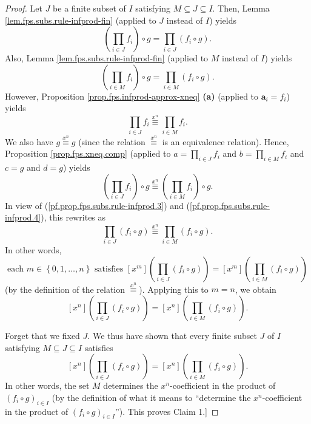\begin{fineprint}
\begin{proof}
Let $J$ be a finite subset of $I$ satisfying $M\subseteq J\subseteq I$. Then,
Lemma \ref{lem.fps.subs.rule-infprod-fin} (applied to $J$ instead of $I$)
yields%
\begin{equation}
\left(  \prod_{i\in J}f_{i}\right)  \circ g=\prod_{i\in J}\left(  f_{i}\circ
g\right)  . \label{pf.prop.fps.subs.rule-infprod.3}%
\end{equation}
Also, Lemma \ref{lem.fps.subs.rule-infprod-fin} (applied to $M$ instead of
$I$) yields%
\begin{equation}
\left(  \prod_{i\in M}f_{i}\right)  \circ g=\prod_{i\in M}\left(  f_{i}\circ
g\right)  . \label{pf.prop.fps.subs.rule-infprod.4}%
\end{equation}
However, Proposition \ref{prop.fps.infprod-approx-xneq} \textbf{(a)} (applied
to $\mathbf{a}_{i}=f_{i}$) yields%
\[
\prod_{i\in J}f_{i}\overset{x^{n}}{\equiv}\prod_{i\in M}f_{i}.
\]
We also have $g\overset{x^{n}}{\equiv}g$ (since the relation $\overset{x^{n}%
}{\equiv}$ is an equivalence relation). Hence, Proposition
\ref{prop.fps.xneq.comp} (applied to $a=\prod_{i\in J}f_{i}$ and
$b=\prod_{i\in M}f_{i}$ and $c=g$ and $d=g$) yields%
\[
\left(  \prod_{i\in J}f_{i}\right)  \circ g\overset{x^{n}}{\equiv}\left(
\prod_{i\in M}f_{i}\right)  \circ g.
\]
In view of (\ref{pf.prop.fps.subs.rule-infprod.3}) and
(\ref{pf.prop.fps.subs.rule-infprod.4}), this rewrites as%
\[
\prod_{i\in J}\left(  f_{i}\circ g\right)  \overset{x^{n}}{\equiv}\prod_{i\in
M}\left(  f_{i}\circ g\right)  .
\]
In other words,
\[
\text{each }m\in\left\{  0,1,\ldots,n\right\}  \text{ satisfies }\left[
x^{m}\right]  \left(  \prod_{i\in J}\left(  f_{i}\circ g\right)  \right)
=\left[  x^{m}\right]  \left(  \prod_{i\in M}\left(  f_{i}\circ g\right)
\right)
\]
(by the definition of the relation $\overset{x^{n}}{\equiv}$). Applying this
to $m=n$, we obtain%
\[
\left[  x^{n}\right]  \left(  \prod_{i\in J}\left(  f_{i}\circ g\right)
\right)  =\left[  x^{n}\right]  \left(  \prod_{i\in M}\left(  f_{i}\circ
g\right)  \right)  .
\]


Forget that we fixed $J$. We thus have shown that every finite subset $J$ of
$I$ satisfying $M\subseteq J\subseteq I$ satisfies%
\[
\left[  x^{n}\right]  \left(  \prod_{i\in J}\left(  f_{i}\circ g\right)
\right)  =\left[  x^{n}\right]  \left(  \prod_{i\in M}\left(  f_{i}\circ
g\right)  \right)  .
\]
In other words, the set $M$ determines the $x^{n}$-coefficient in the product
of $\left(  f_{i}\circ g\right)  _{i\in I}$ (by the definition of what it
means to \textquotedblleft determine the $x^{n}$-coefficient in the product of
$\left(  f_{i}\circ g\right)  _{i\in I}$\textquotedblright). This proves Claim
1.] \medskip


\end{proof}
\end{fineprint}
